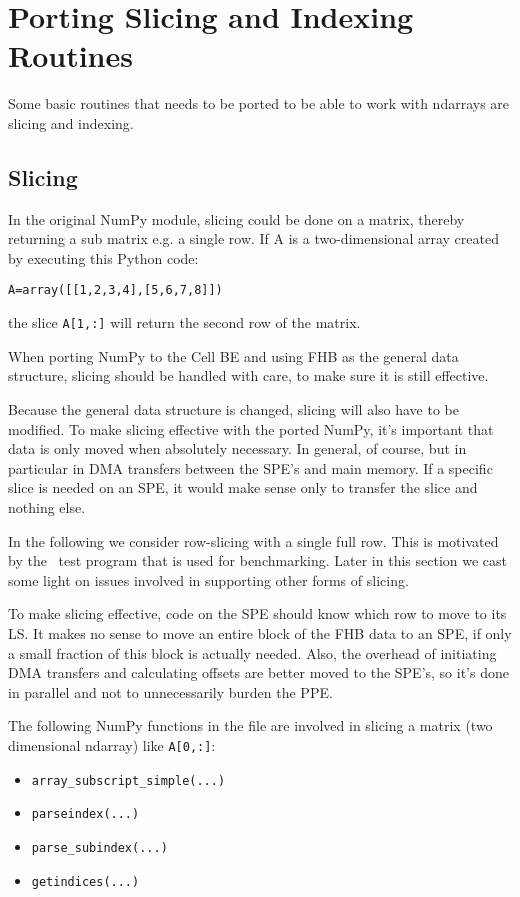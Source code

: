 \section{Porting Slicing and Indexing Routines}
Some basic routines that needs to be ported to be able to work with ndarrays are slicing and indexing.
\subsection{Slicing}
\label{subsec:slicing}
In the original NumPy module, slicing could be done on a matrix,
thereby returning a sub matrix e.g. a single row. If A is a
two-dimensional array created by executing this Python code:
\begin{center}\texttt{A=array([[1,2,3,4],[5,6,7,8]])}\end{center}
the slice \texttt{A[1,:]} will return the second row of the matrix.

When porting NumPy to the Cell BE and using FHB as the general data
structure, slicing should be handled with care, to make sure it is
still effective.

Because the general data structure is changed, slicing will also have
to be modified. To make slicing effective with the ported NumPy, it's
important that data is only moved when absolutely necessary. In
general, of course, but in particular in DMA transfers between the
SPE's and main memory. If a specific slice is needed on an SPE, it
would make sense only to transfer the slice and nothing else.

In the following we consider row-slicing
with a single full row. This is motivated by the \SOR\ test program that
is used for benchmarking. Later in this section we cast some light on issues
involved in supporting other forms of slicing.

To make slicing effective, code on the SPE should know which row to
move to its LS. It makes no sense to move an entire block of the FHB
data to an SPE, if only a small fraction of this block is actually
needed. Also, the overhead of initiating DMA transfers and calculating offsets
are better moved to the SPE's, so it's done in parallel and not to unnecessarily
burden the PPE.

The following NumPy functions in the file 
are involved in slicing a matrix (two dimensional ndarray) like \texttt{A[0,:]}:

\begin{itemize}
\item{\texttt{array\_subscript\_simple(...)}}
\item{\texttt{parseindex(...)}}
\item{\texttt{parse\_subindex(...)}}
\item{\texttt{getindices(...)}}
\end{itemize}


